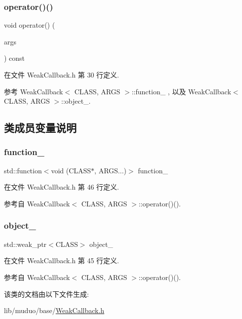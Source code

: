 \subsubsection{\texorpdfstring{operator()()}{operator()()}}
{\footnotesize\ttfamily void operator() (\begin{DoxyParamCaption}\item[{A\+R\+GS \&\&...}]{args }\end{DoxyParamCaption}) const\hspace{0.3cm}{\ttfamily [inline]}}



在文件 Weak\+Callback.\+h 第 30 行定义.



参考 Weak\+Callback$<$ C\+L\+A\+S\+S, A\+R\+G\+S $>$\+::function\+\_\+ , 以及 Weak\+Callback$<$ C\+L\+A\+S\+S, A\+R\+G\+S $>$\+::object\+\_\+.



\subsection{类成员变量说明}
\mbox{\label{classmuduo_1_1WeakCallback_ab07abe69e9a619ff06455edebb7aee64}} 
\subsubsection{\texorpdfstring{function\+\_\+}{function\_}}
{\footnotesize\ttfamily std\+::function$<$void (C\+L\+A\+SS$\ast$, A\+R\+G\+S...)$>$ function\+\_\+\hspace{0.3cm}{\ttfamily [private]}}



在文件 Weak\+Callback.\+h 第 46 行定义.



参考自 Weak\+Callback$<$ C\+L\+A\+S\+S, A\+R\+G\+S $>$\+::operator()().

\mbox{\label{classmuduo_1_1WeakCallback_a0b18c89cc214310eb53187794fd9c4ad}} 
\subsubsection{\texorpdfstring{object\+\_\+}{object\_}}
{\footnotesize\ttfamily std\+::weak\+\_\+ptr$<$C\+L\+A\+SS$>$ object\+\_\+\hspace{0.3cm}{\ttfamily [private]}}



在文件 Weak\+Callback.\+h 第 45 行定义.



参考自 Weak\+Callback$<$ C\+L\+A\+S\+S, A\+R\+G\+S $>$\+::operator()().



该类的文档由以下文件生成\+:\begin{DoxyCompactItemize}
\item 
lib/muduo/base/\hyperlink{WeakCallback_8h}{Weak\+Callback.\+h}\end{DoxyCompactItemize}
